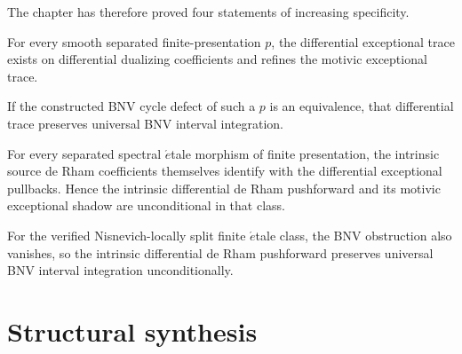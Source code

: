 \begin{remark}
\label{rem:dr-int-integration-scope}
The chapter has therefore proved four statements of increasing specificity.

For every smooth separated finite-presentation \(p\), the differential
exceptional trace exists on differential dualizing coefficients and refines
the motivic exceptional trace.

If the constructed BNV cycle defect of such a \(p\) is an equivalence, that
differential trace preserves universal BNV interval integration.

For every separated spectral \(\acute{e}\)tale morphism of finite
presentation, the intrinsic source de Rham coefficients themselves identify
with the differential exceptional pullbacks.  Hence the intrinsic differential
de Rham pushforward and its motivic exceptional shadow are unconditional in
that class.

For the verified Nisnevich-locally split finite \(\acute{e}\)tale class, the
BNV obstruction also vanishes, so the intrinsic differential de Rham
pushforward preserves universal BNV interval integration unconditionally.
\end{remark}



\section{Structural synthesis}
\label{sec:monadic-de-rham-synthesis}

